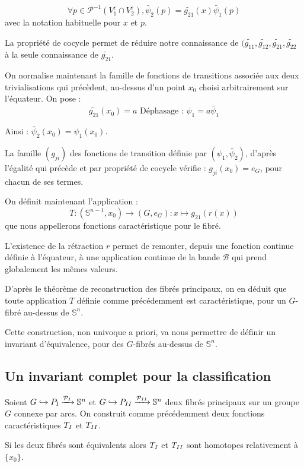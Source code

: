 \[\forall p \in \mathcal{P}^{-1}(V_1^{\varepsilon} \cap V_2^{\varepsilon}) , \tilde{\psi_2}(p) = \tilde{g_{21}}(x) \tilde{\psi_1}(p)\]
avec la notation habituelle pour $x$ et $p$.

\par
La propriété de cocycle permet de réduire notre connaissance de $(\tilde{g_{11}},\tilde{g_{12}},\tilde{g_{21}},\tilde{g_{22}}$ à la seule connaissance de $\tilde{g_{21}}$.

\par
On normalise maintenant la famille de fonctions de transitions associée aux deux trivialisations qui précèdent, %
au-dessus d'un point $x_0$ choisi arbitrairement sur l'équateur. On pose :
\[\tilde{g_{21}}(x_0) = a\text{ Déphasage : }\psi_1 = a \tilde{\psi_1}\]

Ainsi : $\tilde{\psi_2}(x_0) = \psi_1(x_0)$.

La famille $(g_{ji})$ des fonctions de transition définie par $(\psi_1,\tilde{\psi_2})$, %
d'après l'égalité qui précède et par propriété de cocycle vérifie : $g_{ji}(x_0) = e_G$, pour chacun de ses termes.

\par
On définit maintenant l'application :
\[T : (\mathbb{S}^{n-1},x_0) \rightarrow (G,e_G) : x \mapsto g_{21}(r(x))\]
que nous appellerons fonctions caractéristique pour le fibré.

L'existence de la rétraction $r$ permet de remonter, depuis une fonction continue définie à l'équateur, %
à une application continue de la bande $\mathcal{B}$ qui prend globalement les mêmes valeurs.

\par
D'après le théorème de reconstruction des fibrés principaux, %
on en déduit que toute application $T$ définie comme précédemment est caractéristique, pour un $G$-fibré au-dessus de $\mathbb{S}^n$.

\par
Cette construction, non univoque a priori, va nous permettre de définir un invariant d'équivalence, pour des $G$-fibrés au-dessus de $\mathbb{S}^n$.

\subsection{Un invariant complet pour la classification}

\begin{theo}\label{tinv}
Soient $G \hookrightarrow P_\tc{\Rom{1}} \xrightarrow{\mathcal{P}_{\Rom{1}}} \mathbb{S}^n$ et $G \hookrightarrow P_{\Rom{2}} \xrightarrow{\mathcal{P}_{\Rom{2}}} \mathbb{S}^n$ %
deux fibrés principaux sur un groupe $G$ connexe par arcs. %
On construit comme précédemment deux fonctions caractéristiques $T_{\Rom{1}}$ et $T_{\Rom{2}}$.
\par
Si les deux fibrés sont équivalents alors $T_{\Rom{1}}$ et $T_{\Rom{2}}$ sont homotopes relativement à $\{x_0\}$.
\end{theo}

